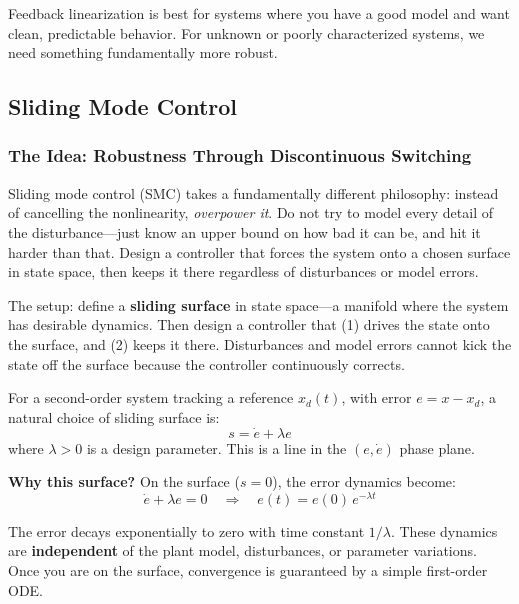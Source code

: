 Feedback linearization is best for systems where you have a good model and want clean, predictable behavior. For unknown or poorly characterized systems, we need something fundamentally more robust.

\subsection{Sliding Mode Control}

\subsubsection{The Idea: Robustness Through Discontinuous Switching}

Sliding mode control (SMC) takes a fundamentally different philosophy: instead of cancelling the nonlinearity, \textit{overpower it}. Do not try to model every detail of the disturbance---just know an upper bound on how bad it can be, and hit it harder than that. Design a controller that forces the system onto a chosen surface in state space, then keeps it there regardless of disturbances or model errors.

The setup: define a \textbf{sliding surface} in state space---a manifold where the system has desirable dynamics. Then design a controller that (1) drives the state onto the surface, and (2) keeps it there. Disturbances and model errors cannot kick the state off the surface because the controller continuously corrects.

For a second-order system tracking a reference $x_d(t)$, with error $e = x - x_d$, a natural choice of sliding surface is:
\begin{equation}
s = \dot{e} + \lambda e
\end{equation}
where $\lambda > 0$ is a design parameter. This is a line in the $(e, \dot{e})$ phase plane.

\textbf{Why this surface?} On the surface ($s = 0$), the error dynamics become:
\begin{equation}
\dot{e} + \lambda e = 0 \quad \Longrightarrow \quad e(t) = e(0)\,e^{-\lambda t}
\end{equation}

The error decays exponentially to zero with time constant $1/\lambda$. These dynamics are \textbf{independent} of the plant model, disturbances, or parameter variations. Once you are on the surface, convergence is guaranteed by a simple first-order ODE.

